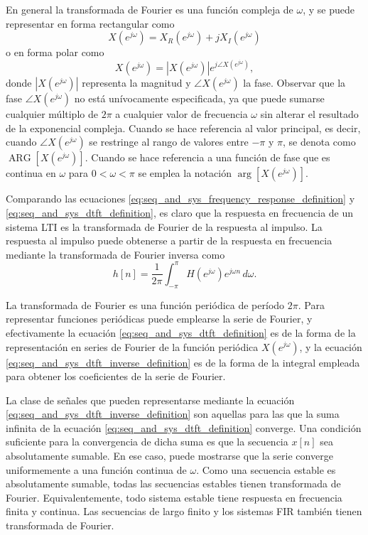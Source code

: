 \documentclass[a4paper]{report}
\DeclareMathOperator{\ARG}{ARG}
\begin{document}
En general la transformada de Fourier es una función compleja de \(\omega\), y se puede representar en forma rectangular como
\[
 X(e^{j\omega})=X_R(e^{j\omega})+jX_I(e^{j\omega})
\]
o en forma polar como
\[
 X(e^{j\omega})=|X(e^{j\omega})|e^{j\angle X(e^{j\omega})},
\]
donde \(|X(e^{j\omega})|\) representa la magnitud y \(\angle X(e^{j\omega})\) la fase. Observar que la fase \(\angle X(e^{j\omega})\) no está unívocamente especificada, ya que puede sumarse cualquier múltiplo de \(2\pi\) a cualquier valor de frecuencia \(\omega\) sin alterar el resultado de la exponencial compleja. Cuando se hace referencia al valor principal, es decir, cuando \(\angle X(e^{j\omega})\) se restringe al rango de valores entre \(-\pi\) y \(\pi\), se denota como \(\ARG[X(e^{j\omega})]\). Cuando se hace referencia a una función de fase que es continua en \(\omega\) para \(0<\omega<\pi\) se emplea la notación \(\arg[X(e^{j\omega})]\).
 
Comparando las ecuaciones \ref{eq:seq_and_sys_frequency_response_definition} y \ref{eq:seq_and_sys_dtft_definition}, es claro que la respuesta en frecuencia de un sistema LTI es la transformada de Fourier de la respuesta al impulso. La respuesta al impulso puede obtenerse a partir de la respuesta en frecuencia mediante la transformada de Fourier inversa como
\[
 h[n]=\frac{1}{2\pi}\int_{-\pi}^\pi H(e^{j\omega})e^{j\omega n}\,d\omega.
\]

La transformada de Fourier es una función periódica de período \(2\pi\). Para representar funciones periódicas puede emplearse la serie de Fourier, y efectivamente la ecuación \ref{eq:seq_and_sys_dtft_definition} es de la forma de la representación en series de Fourier de la función periódica \(X(e^{j\omega})\), y la ecuación \ref{eq:seq_and_sys_dtft_inverse_definition} es de la forma de la integral empleada para obtener los coeficientes de la serie de Fourier.

La clase de señales que pueden representarse mediante la ecuación \ref{eq:seq_and_sys_dtft_inverse_definition} son aquellas para las que la suma infinita de la ecuación \ref{eq:seq_and_sys_dtft_definition} converge. Una condición suficiente para la convergencia de dicha suma es que la secuencia \(x[n]\) sea absolutamente sumable. En ese caso, puede mostrarse que la serie converge uniformemente a una función continua de \(\omega\). Como una secuencia estable es absolutamente sumable, todas las secuencias estables tienen transformada de Fourier. Equivalentemente, todo sistema estable tiene respuesta en frecuencia finita y continua. Las secuencias de largo finito y los sistemas FIR también tienen transformada de Fourier.
 
\end{document}
